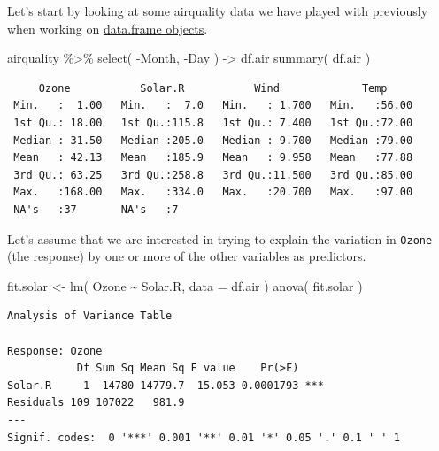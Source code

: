 \documentclass[
  letterpaper,
]{book}
\newenvironment{Shaded}{\begin{snugshade}}{\end{snugshade}}
\newcommand{\AttributeTok}[1]{\textcolor[rgb]{0.40,0.45,0.13}{#1}}
\newcommand{\FunctionTok}[1]{\textcolor[rgb]{0.28,0.35,0.67}{#1}}
\newcommand{\NormalTok}[1]{\textcolor[rgb]{0.00,0.23,0.31}{#1}}
\newcommand{\OtherTok}[1]{\textcolor[rgb]{0.00,0.23,0.31}{#1}}
\newcommand{\SpecialCharTok}[1]{\textcolor[rgb]{0.37,0.37,0.37}{#1}}
\begin{document}
Let's start by looking at some airquality data we have played with
previously when working on
\href{https://dyerlab.github.io/ENVS-Lectures/r_language/data_frames/homework.nb.html}{data.frame
objects}.

\begin{Shaded}
\begin{Highlighting}[]
\NormalTok{airquality }\SpecialCharTok{\%\textgreater{}\%}
  \FunctionTok{select}\NormalTok{( }\SpecialCharTok{{-}}\NormalTok{Month, }\SpecialCharTok{{-}}\NormalTok{Day ) }\OtherTok{{-}\textgreater{}}\NormalTok{ df.air}
\FunctionTok{summary}\NormalTok{( df.air )}
\end{Highlighting}
\end{Shaded}

\begin{verbatim}
     Ozone           Solar.R           Wind             Temp      
 Min.   :  1.00   Min.   :  7.0   Min.   : 1.700   Min.   :56.00  
 1st Qu.: 18.00   1st Qu.:115.8   1st Qu.: 7.400   1st Qu.:72.00  
 Median : 31.50   Median :205.0   Median : 9.700   Median :79.00  
 Mean   : 42.13   Mean   :185.9   Mean   : 9.958   Mean   :77.88  
 3rd Qu.: 63.25   3rd Qu.:258.8   3rd Qu.:11.500   3rd Qu.:85.00  
 Max.   :168.00   Max.   :334.0   Max.   :20.700   Max.   :97.00  
 NA's   :37       NA's   :7                                       
\end{verbatim}

Let's assume that we are interested in trying to explain the variation
in \texttt{Ozone} (the response) by one or more of the other variables
as predictors.

\begin{Shaded}
\begin{Highlighting}[]
\NormalTok{fit.solar }\OtherTok{\textless{}{-}} \FunctionTok{lm}\NormalTok{( Ozone }\SpecialCharTok{\textasciitilde{}}\NormalTok{ Solar.R, }\AttributeTok{data =}\NormalTok{ df.air )}
\FunctionTok{anova}\NormalTok{( fit.solar )}
\end{Highlighting}
\end{Shaded}

\begin{verbatim}
Analysis of Variance Table

Response: Ozone
           Df Sum Sq Mean Sq F value    Pr(>F)    
Solar.R     1  14780 14779.7  15.053 0.0001793 ***
Residuals 109 107022   981.9                      
---
Signif. codes:  0 '***' 0.001 '**' 0.01 '*' 0.05 '.' 0.1 ' ' 1
\end{verbatim}
\end{document}
